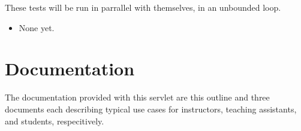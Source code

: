 \documentclass{article}
\begin{document}
These tests will be run in parrallel with themselves, in an unbounded loop.

\begin{itemize}
\item{None yet.}
\end{itemize}


\section{Documentation}\label{sec:docs}

The documentation provided with this servlet are this outline and three
documents each describing typical use cases for instructors, teaching
assistants, and students, respecitively.
\end{document}
